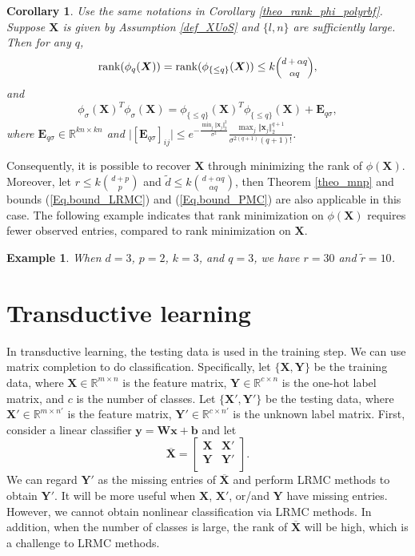 \documentclass[letterpaper]{article} %
\newtheorem{example}{Example}
\newtheorem{corollary}{Corollary}
\begin{document}
\begin{corollary}\label{theo_rank_phi_polyrbf_uos}
Use the same notations in Corollary \ref{theo_rank_phi_polyrbf}. Suppose $\bm{X}$ is given by Assumption \ref{def_XUoS} and $\lbrace l,n\rbrace$ are sufficiently large. Then for any $q$,
$$
\textup{rank}(\phi_q(\bm{X}))=\textup{rank}(\phi_{\lbrace\leq q\rbrace}(\bm{X}))\leq k\scaleobj{0.8}{\binom{d+\alpha q}{\alpha q}},$$
and $$
\phi_{\sigma}(\bm{X})^T\phi_{\sigma}(\bm{X})=\phi_{\lbrace\leq q\rbrace}(\bm{X})^T\phi_{\lbrace\leq q\rbrace}(\bm{X})+\bm{E}_{q\sigma},
$$
where $\bm{E}_{q\sigma}\in\mathbb{R}^{kn\times kn}$ and $\vert[\bm{E}_{q\sigma}]_{ij}\vert\leq e^{-\tfrac{\min_{j}\Vert \bm{x}_j\Vert_2^2}{\sigma^2}}\tfrac{\max_{j}\Vert \bm{x}_j\Vert_2^{q+1}}{\sigma^{2(q+1)}(q+1)!}$.
\end{corollary}
\noindent Consequently, it is possible to recover $\bm{X}$ through minimizing the rank of $\phi(\bm{X})$. Moreover, let $r\leq k\binom{d+p}{p}$ and $\tilde{d}\leq k\binom{d+\alpha q}{\alpha q}$, then Theorem \ref{theo_mnp} and bounds (\ref{Eq.bound_LRMC}) and (\ref{Eq.bound_PMC}) are also applicable in this case. The following example indicates that rank minimization on $\phi(\bm{X})$ requires fewer observed entries, compared to rank minimization on $\bm{X}$.
\begin{example}
When $d=3$, $p=2$, $k=3$, and $q=3$, we have $r=30$ and $\tilde{r}=10$.
\end{example}
\noindent



\section{Transductive learning}
In transductive learning, the testing data is used in the training step. We can use matrix completion to do classification. Specifically, let $\lbrace \bm{X}, \bm{Y}\rbrace$ be the training data, where $\bm{X}\in\mathbb{R}^{m\times n}$ is the feature matrix, $\bm{Y}\in\mathbb{R}^{c\times n}$ is the one-hot label matrix, and $c$ is the number of classes. Let $\lbrace \bm{X}', \bm{Y}'\rbrace$ be the testing data, where $\bm{X}'\in\mathbb{R}^{m\times n'}$ is the feature matrix, $\bm{Y}'\in\mathbb{R}^{c\times n'}$ is the unknown label matrix. First, consider a linear classifier $\bm{y}=\bm{W}\bm{x}+\bm{b}$ and let
\begin{equation}
\overline{\bm{X}}=\left[
\begin{matrix}
\bm{X}&\bm{X}'\\
\bm{Y}&\bm{Y}'\\
\end{matrix}
\right].
\end{equation}
We can regard $\bm{Y}'$ as the missing entries of $\overline{\bm{X}}$ and perform LRMC methods to obtain $\bm{Y}'$. It will be more useful when $\bm{X}$, $\bm{X}'$, or/and $\bm{Y}$ have missing entries. However, we cannot obtain nonlinear classification via LRMC methods. In addition, when the number of classes is large, the rank of $\overline{\bm{X}}$ will be high, which is a challenge to LRMC methods.
\end{document}
